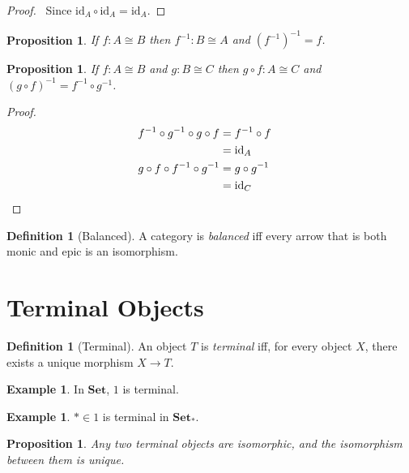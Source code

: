 \documentclass{article}
\let\qed\relax
\newtheorem{proposition}[axiom]{Proposition}
\theoremstyle{definition}
\newtheorem{definition}[axiom]{Definition}
\newtheorem{example}[axiom]{Example}
\newcommand{\inv}[1]{\ensuremath{{#1}^{-1}}}
\newcommand{\id}[1]{\ensuremath{\mathrm{id}_{#1}}}
\begin{document}
\begin{proof}
    \pf\ Since $\id{A} \circ \id{A} = \id{A}$. \qed
\end{proof}

\begin{proposition}
    If $f : A \cong B$ then $\inv{f} : B \cong A$ and $\inv{(\inv{f})} = f$.
\end{proposition}

\begin{proposition}
    If $f : A \cong B$ and $g : B \cong C$ then $g \circ f : A \cong C$ and
    $\inv{(g \circ f)} = \inv{f} \circ \inv{g}$.
\end{proposition}

\begin{proof}
    \pf
    \begin{align*}
        \inv{f} \circ \inv{g} \circ g \circ f & = \inv{f} \circ f \\
        & = \id{A} \\
        g \circ f \circ \inv{f} \circ \inv{g} & = g \circ \inv{g} \\
        & = \id{C} & \qed
    \end{align*}
\end{proof}

\begin{definition}[Balanced]
    A category is \emph{balanced} iff every arrow that is both monic and epic is an
    isomorphism.
\end{definition}


\section{Terminal Objects}

\begin{definition}[Terminal]
    An object $T$ is \emph{terminal} iff, for every object $X$, there exists a
    unique morphism $X \rightarrow T$.
\end{definition}

\begin{example}
    In $\mathbf{Set}$, $1$ is terminal.
\end{example}

\begin{example}
    $* \in 1$ is terminal in $\mathbf{Set}_*$.
\end{example}

\begin{proposition}
    \label{proposition:terminal_unique}
    Any two terminal objects are isomorphic, and the isomorphism between them is unique.
\end{proposition}
\end{document}
